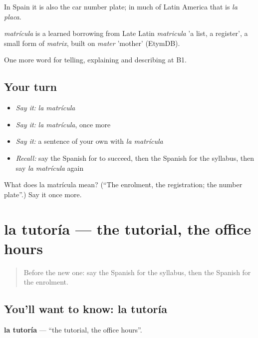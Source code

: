 In Spain it is also the car number plate; in much of Latin America that is \emph{la placa}.

\begin{cousinweb}
\emph{matrícula} is a learned borrowing from Late Latin \emph{matricula} 'a list, a register', a small form of \emph{matrix}, built on \emph{mater} 'mother' (EtymDB).
\end{cousinweb}

\begin{grammarlens}[title={What you've built}]
One more word for telling, explaining and describing at B1.
\end{grammarlens}

\subsection*{Your turn}
\begin{itemize}
\raggedright
  \item \emph{Say it:} \emph{la matrícula}
  \item \emph{Say it:} \emph{la matrícula}, once more
  \item \emph{Say it:} a sentence of your own with \emph{la matrícula}
  \item \emph{Recall:} say the Spanish for to succeed, then the Spanish for the syllabus, then say \emph{la matrícula} again
\end{itemize}

\begin{tcolorbox}[breakable,colback=teal!4,colframe=teal!35!black,title={Before you move on}]
What does la matrícula mean? (\textquotedblleft{}The enrolment, the registration; the number plate\textquotedblright{}.) Say it once more.
\end{tcolorbox}
\section[la tutoría]{la tutoría — the tutorial, the office hours}

\label{lesson:ES-C596-tutoria}



\begin{quote}
Before the new one: say the Spanish for the syllabus, then the Spanish for the enrolment.
\end{quote}

\subsection*{You'll want to know: la tutoría}
\textbf{la tutoría} — \textquotedblleft{}the tutorial, the office hours\textquotedblright{}.

